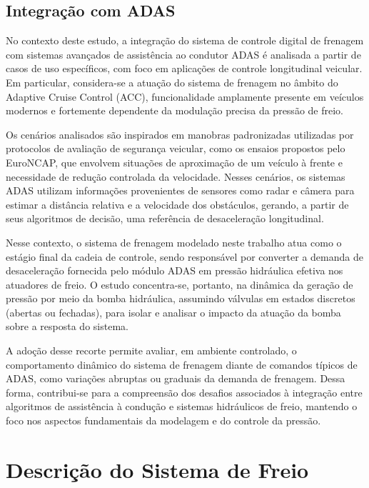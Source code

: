 \subsection{Integração com ADAS}
\label{sebsec:metodologia-3-1}
No contexto deste estudo, a integração do sistema de controle digital de frenagem com sistemas avançados de assistência ao condutor ADAS é analisada a partir de casos de uso específicos, com foco em aplicações de controle longitudinal veicular. Em particular, considera-se a atuação do sistema de frenagem no âmbito do Adaptive Cruise Control (ACC), funcionalidade amplamente presente em veículos modernos e fortemente dependente da modulação precisa da pressão de freio.

Os cenários analisados são inspirados em manobras padronizadas utilizadas por protocolos de avaliação de segurança veicular, como os ensaios propostos pelo EuroNCAP, que envolvem situações de aproximação de um veículo à frente e necessidade de redução controlada da velocidade. Nesses cenários, os sistemas ADAS utilizam informações provenientes de sensores como radar e câmera para estimar a distância relativa e a velocidade dos obstáculos, gerando, a partir de seus algoritmos de decisão, uma referência de desaceleração longitudinal.

Nesse contexto, o sistema de frenagem modelado neste trabalho atua como o estágio final da cadeia de controle, sendo responsável por converter a demanda de desaceleração fornecida pelo módulo ADAS em pressão hidráulica efetiva nos atuadores de freio. O estudo concentra-se, portanto, na dinâmica da geração de pressão por meio da bomba hidráulica, assumindo válvulas em estados discretos (abertas ou fechadas), para isolar e analisar o impacto da atuação da bomba sobre a resposta do sistema.

A adoção desse recorte permite avaliar, em ambiente controlado, o comportamento dinâmico do sistema de frenagem diante de comandos típicos de ADAS, como variações abruptas ou graduais da demanda de frenagem. Dessa forma, contribui-se para a compreensão dos desafios associados à integração entre algoritmos de assistência à condução e sistemas hidráulicos de freio, mantendo o foco nos aspectos fundamentais da modelagem e do controle da pressão.

\section{Descrição do Sistema de Freio}
\label{sec:metodologia-4}

